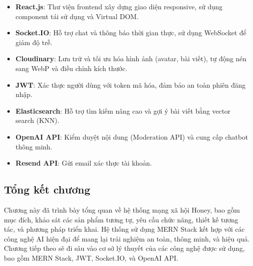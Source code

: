 \begin{itemize}
    \item \textbf{React.js}: Thư viện frontend xây dựng giao diện responsive, sử dụng component tái sử dụng và Virtual DOM.
    \item \textbf{Socket.IO}: Hỗ trợ chat và thông báo thời gian thực, sử dụng WebSocket để giảm độ trễ.
    \item \textbf{Cloudinary}: Lưu trữ và tối ưu hóa hình ảnh (avatar, bài viết), tự động nén sang WebP và điều chỉnh kích thước.
\end{itemize}

\begin{itemize}
    \item \textbf{JWT}: Xác thực người dùng với token mã hóa, đảm bảo an toàn phiên đăng nhập.
    \item \textbf{Elasticsearch}: Hỗ trợ tìm kiếm nâng cao và gợi ý bài viết bằng vector search (KNN).
    \item \textbf{OpenAI API}: Kiểm duyệt nội dung (Moderation API) và cung cấp chatbot thông minh.
    \item \textbf{Resend API}: Gửi email xác thực tài khoản.
\end{itemize}

\subsection{Tổng kết chương}
Chương này đã trình bày tổng quan về hệ thống mạng xã hội Honey, bao gồm mục đích, khảo sát các sản phẩm tương tự, yêu cầu chức năng, thiết kế tương tác, và phương pháp triển khai. Hệ thống sử dụng MERN Stack kết hợp với các công nghệ AI hiện đại để mang lại trải nghiệm an toàn, thông minh, và hiệu quả. Chương tiếp theo sẽ đi sâu vào cơ sở lý thuyết của các công nghệ được sử dụng, bao gồm MERN Stack, JWT, Socket.IO, và OpenAI API.
